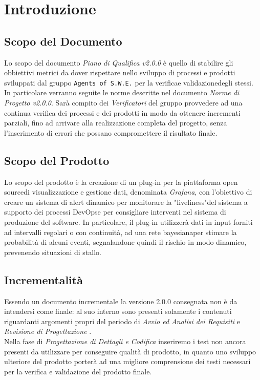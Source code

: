 \section{Introduzione}
\label{introduzione}

\subsection{Scopo del Documento}

Lo scopo del documento \textit{Piano di Qualifica v2.0.0} è quello di stabilire gli obbiettivi metrici da dover rispettare nello sviluppo di processi e prodotti sviluppati dal gruppo \texttt{Agents of S.W.E.} per la verifica\glossario e validazione\glossario degli stessi. In particolare verranno seguite le norme descritte nel documento \textit{Norme di Progetto v2.0.0}. Sarà compito dei \textit{Verificatori} del gruppo provvedere ad una continua verifica dei processi e dei prodotti in modo da ottenere incrementi parziali, fino ad arrivare alla realizzazione completa del progetto, senza l'inserimento di errori che possano compromettere il risultato finale. 

\subsection{Scopo del Prodotto}
Lo scopo del prodotto è la creazione di un plug-in per la piattaforma open source\glossario di visualizzazione e gestione dati, denominata \textit{Grafana}, 
con l'obiettivo di creare un sistema di alert dinamico per monitorare la "liveliness"\glossario del sistema a supporto dei processi
DevOps\glossario e per consigliare interventi nel sistema di produzione del software.
In particolare, il plug-in utilizzerà dati in input forniti ad intervalli regolari o con continuità, ad una rete bayesiana\glossario per stimare la probabilità di alcuni eventi, segnalandone quindi il rischio in modo dinamico, prevenendo situazioni di stallo.   

\subsection{Incrementalità}
Essendo un documento incrementale la versione 2.0.0 consegnata non è da intendersi come finale: al suo interno sono presenti solamente i contenuti riguardanti argomenti propri del periodo di \textit{Avvio ed Analisi dei Requisiti} e \textit{Revisione di Progettazione} . \\
Nella fase di \textit{Progettazione di Dettagli e Codifica} inseriremo i test non ancora presenti da utilizzare per conseguire qualità di prodotto, in quanto uno sviluppo ulteriore del prodotto  porterà ad una migliore comprensione dei testi necessari per la verifica e validazione del prodotto finale.


